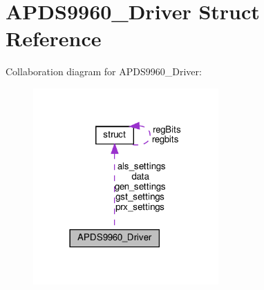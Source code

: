 \hypertarget{structAPDS9960__Driver}{}\section{A\+P\+D\+S9960\+\_\+\+Driver Struct Reference}
\label{structAPDS9960__Driver}


Collaboration diagram for A\+P\+D\+S9960\+\_\+\+Driver\+:\nopagebreak
\begin{figure}[H]
\begin{center}
\leavevmode
\includegraphics[width=201pt]{structAPDS9960__Driver__coll__graph}
\end{center}
\end{figure}
